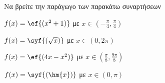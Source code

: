 Να βρείτε την παράγωγο των παρακάτω συναρτήσεων
\begin{multicols}{2}
\begin{alist}
\item $ f(x)=\ef{(x^2+1)} $ με $ x\in\left(-\frac{\pi}{4},\frac{\pi}{4}\right) $
\item $ f(x)=\syf{\left(\sqrt{x}\right)} $ με $ x\in(0,2\pi) $
\item $ f(x)=\ef{(4x-x^2)} $ με $ x\in\left(\frac{\pi}{8},\frac{9\pi}{8}\right) $
\item $ f(x)=\syf{(\hm{x})} $ με $ x\in(0,\pi) $
\end{alist}
\end{multicols}
